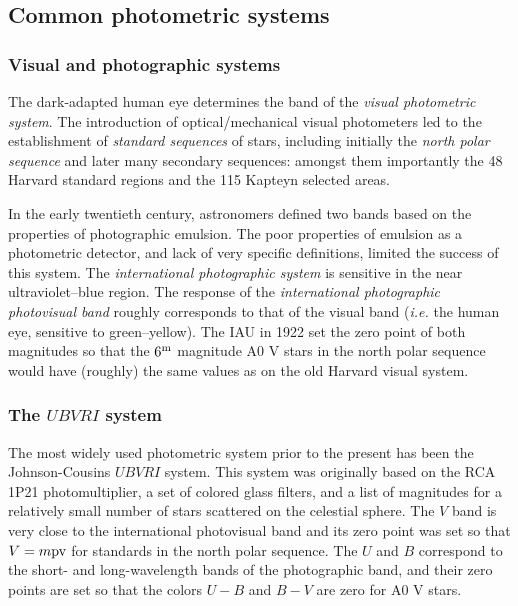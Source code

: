 \subsection{Common photometric systems}

\subsubsection{Visual and photographic systems}
The dark-adapted human eye
determines the band of the {\it visual photometric system}. The
introduction of optical/mechanical visual photometers led to the
establishment of {\it standard sequences} of stars, including
initially the {\it north polar sequence} and later many secondary
sequences: amongst them importantly the 48 Harvard standard regions and the 115 Kapteyn
selected areas.

In the
early twentieth century, astronomers defined two bands based on the
properties of photographic emulsion. The
poor properties of emulsion as a photometric detector, and lack of 
very specific definitions, limited the success of this system. The
{\it international photographic system} is sensitive in the near
ultraviolet--blue region. The response of the {\it international
  photographic photovisual band} roughly corresponds to that of the
visual band ({\it i.e.} the human eye, sensitive to green--yellow). The
IAU in 1922 set the zero point of both magnitudes so that the $6^{\rm
  m}$ magnitude A0 V stars in the north polar sequence would have
(roughly) the same values as on the old Harvard visual system.

\subsubsection{The $UBVRI$ system}
The most widely used photometric system
prior to the present has been the Johnson-Cousins $UBVRI$ system. This
system was originally based on the RCA 1P21 photomultiplier, a set of
colored glass filters, and a list of magnitudes for a relatively small
number of stars scattered on the celestial sphere. The $V$ band is very
close to the international photovisual band and its zero point was set
so that $V=m{\rm pv}$ for standards in the north polar sequence. The $U$
and $B$ correspond to the short- and long-wavelength bands of the
photographic band, and their zero points are set so that the colors
$U-B$ and $B-V$ are zero for A0 V stars. 

